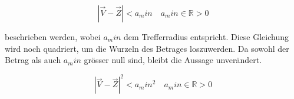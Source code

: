 \begin{equation}
    |\vec{V}-\vec{Z}|<a_min \quad a_min\in\mathbb{R}>0
\end{equation}

beschrieben werden, wobei $a_min$ dem Trefferradius entspricht.
Diese Gleichung wird noch quadriert, um die Wurzeln des Betrages loszuwerden.
Da sowohl der Betrag als auch $a_min$ grösser null sind, bleibt die Aussage unverändert.

\begin{equation}
    |\vec{V}-\vec{Z}|^2<a_min^2 \quad a_min\in \mathbb{R} > 0
\end{equation}


